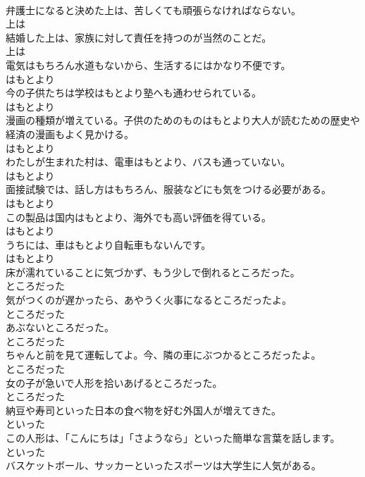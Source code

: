 \documentclass[8pt]{extreport}
\begin{document}
\begin{CJK}{UTF8}{min}
\\	弁護士になると決めた上は、苦しくても頑張らなければならない。	
\\	上は
\\	結婚した上は、家族に対して責任を持つのが当然のことだ。	
\\	上は
\\	電気はもちろん水道もないから、生活するにはかなり不便です。	
\\	はもとより
\\	今の子供たちは学校はもとより塾へも通わせられている。	
\\	はもとより
\\	漫画の種類が増えている。子供のためのものはもとより大人が読むための歴史や経済の漫画もよく見かける。	
\\	はもとより
\\	わたしが生まれた村は、電車はもとより、バスも通っていない。	
\\	はもとより
\\	面接試験では、話し方はもちろん、服装などにも気をつける必要がある。	
\\	はもとより
\\	この製品は国内はもとより、海外でも高い評価を得ている。	
\\	はもとより
\\	うちには、車はもとより自転車もないんです。	
\\	はもとより
\\	床が濡れていることに気づかず、もう少しで倒れるところだった。	
\\	ところだった
\\	気がつくのが遅かったら、あやうく火事になるところだったよ。	
\\	ところだった
\\	あぶないところだった。	
\\	ところだった
\\	ちゃんと前を見て運転してよ。今、隣の車にぶつかるところだったよ。	
\\	ところだった
\\	女の子が急いで人形を拾いあげるところだった。	
\\	ところだった
\\	納豆や寿司といった日本の食べ物を好む外国人が増えてきた。	
\\	といった
\\	この人形は、「こんにちは」「さようなら」といった簡単な言葉を話します。	
\\	といった
\\	バスケットボール、サッカーといったスポーツは大学生に人気がある。	

\end{CJK}
\end{document}
